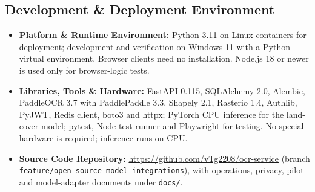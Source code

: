 \documentclass[11pt, a4paper]{article}
\begin{document}
\subsection{Development \& Deployment Environment}
\begin{itemize}[noitemsep, topsep=2pt]
    \item \textbf{Platform \& Runtime Environment:} Python 3.11 on Linux containers for deployment; development and verification on Windows 11 with a Python virtual environment. Browser clients need no installation. Node.js 18 or newer is used only for browser-logic tests.
    \item \textbf{Libraries, Tools \& Hardware:} FastAPI 0.115, SQLAlchemy 2.0, Alembic, PaddleOCR 3.7 with PaddlePaddle 3.3, Shapely 2.1, Rasterio 1.4, Authlib, PyJWT, Redis client, boto3 and httpx; PyTorch CPU inference for the land-cover model; pytest, Node test runner and Playwright for testing. No special hardware is required; inference runs on CPU.
    \item \textbf{Source Code Repository:} \url{https://github.com/vTg2208/ocr-service} (branch \texttt{feature/open-source-model-integrations}), with operations, privacy, pilot and model-adapter documents under \texttt{docs/}.
\end{itemize}
\end{document}
